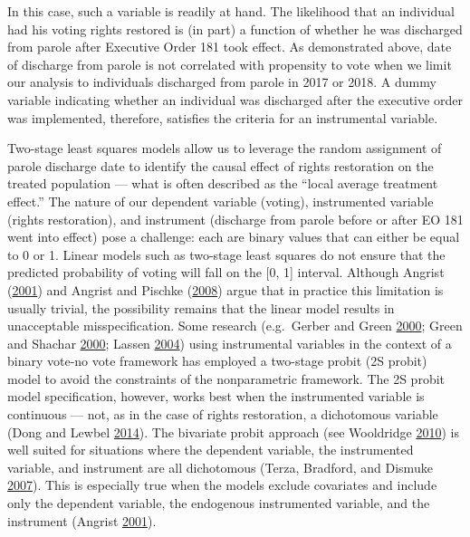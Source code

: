 \documentclass[12pt,]{article}
\begin{document}
In this case, such a variable is readily at hand. The likelihood that an individual had his voting rights restored is (in part) a function of whether he was discharged from parole after Executive Order 181 took effect. As demonstrated above, date of discharge from parole is not correlated with propensity to vote when we limit our analysis to individuals discharged from parole in 2017 or 2018. A dummy variable indicating whether an individual was discharged after the executive order was implemented, therefore, satisfies the criteria for an instrumental variable.

Two-stage least squares models allow us to leverage the random assignment of parole discharge date to identify the causal effect of rights restoration on the treated population --- what is often described as the ``local average treatment effect.'' The nature of our dependent variable (voting), instrumented variable (rights restoration), and instrument (discharge from parole before or after EO 181 went into effect) pose a challenge: each are binary values that can either be equal to 0 or 1. Linear models such as two-stage least squares do not ensure that the predicted probability of voting will fall on the {[}0, 1{]} interval. Although Angrist (\protect\hyperlink{ref-Angrist2001}{2001}) and Angrist and Pischke (\protect\hyperlink{ref-Angrist2008}{2008}) argue that in practice this limitation is usually trivial, the possibility remains that the linear model results in unacceptable misspecification. Some research (e.g.~Gerber and Green \protect\hyperlink{ref-Gerber2000}{2000}; Green and Shachar \protect\hyperlink{ref-Green2000}{2000}; Lassen \protect\hyperlink{ref-Lassen2004}{2004}) using instrumental variables in the context of a binary vote-no vote framework has employed a two-stage probit (2S probit) model to avoid the constraints of the nonparametric framework. The 2S probit model specification, however, works best when the instrumented variable is continuous --- not, as in the case of rights restoration, a dichotomous variable (Dong and Lewbel \protect\hyperlink{ref-Dong2014}{2014}). The bivariate probit approach (see Wooldridge \protect\hyperlink{ref-Wooldridge2010}{2010}) is well suited for situations where the dependent variable, the instrumented variable, and instrument are all dichotomous (Terza, Bradford, and Dismuke \protect\hyperlink{ref-Terza2007}{2007}). This is especially true when the models exclude covariates and include only the dependent variable, the endogenous instrumented variable, and the instrument (Angrist \protect\hyperlink{ref-Angrist2001}{2001}).
\end{document}
